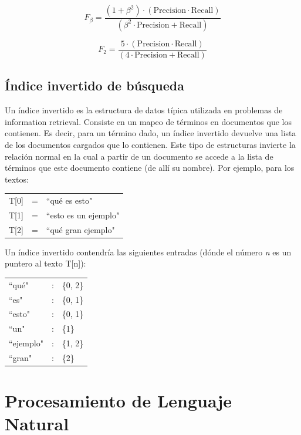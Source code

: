 \begin{equation}\label{eq:fb}
  F_\beta = \frac{(1 + \beta^2) \cdot (\mathrm{Precision} \cdot \mathrm{Recall})}{(\beta^2 \cdot \mathrm{Precision} + \mathrm{Recall})}
\end{equation}


\begin{equation}\label{eq:f2}
  F_2 = \frac{5 \cdot (\mathrm{Precision} \cdot \mathrm{Recall})}{(4 \cdot \mathrm{Precision} + \mathrm{Recall})}
\end{equation}


\subsection{Índice invertido de búsqueda}
\label{subsec:indice-invertido}

Un índice invertido es la estructura de datos típica utilizada en problemas de information retrieval. Consiste en un mapeo de términos en documentos que los contienen. Es decir, para un término dado, un índice invertido devuelve una lista de los documentos cargados que lo contienen. Este tipo de estructuras invierte la relación normal en la cual a partir de un documento se accede a la lista de términos que este documento contiene (de allí su nombre).
Por ejemplo, para los textos:
\medskip

\begin{tabular}{lll}
T[0] & = & ``qué es esto" \\
T[1] & = & ``esto es un ejemplo" \\
T[2] & = & ``qué gran ejemplo" \\
\end{tabular}

\medskip
Un índice invertido contendría las siguientes entradas (dónde el número \textit{n} es un puntero al texto T[n]):
\medskip

\begin{tabular}{lll}
	``qué" & : & \{0, 2\}\\
	``es" &:& \{0, 1\}\\
	``esto" & :& \{0, 1\} \\
	``un" & :&   \{1\} \\
	``ejemplo" & :& \{1, 2\} \\
	``gran" & :& \{2\} \\
\end{tabular}


\section{Procesamiento de Lenguaje Natural}
\label{sec:nlp}

